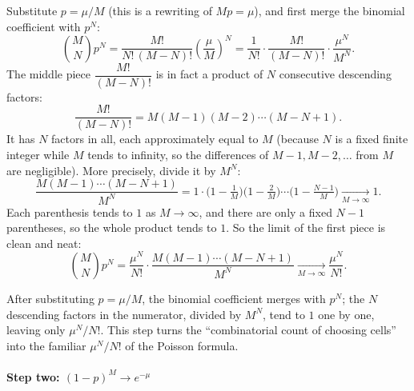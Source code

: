 Substitute $p=\mu/M$ (this is a rewriting of $Mp=\mu$), and first merge the binomial coefficient with $p^N$:
\[
  \binom{M}{N}p^{N}
  =\frac{M!}{N!\,(M-N)!}\left(\frac{\mu}{M}\right)^{N}
  =\frac{1}{N!}\cdot\frac{M!}{(M-N)!}\cdot\frac{\mu^{N}}{M^{N}} .
\]
The middle piece $\dfrac{M!}{(M-N)!}$ is in fact a product of $N$ consecutive descending factors:
\[
  \frac{M!}{(M-N)!}=M(M-1)(M-2)\cdots(M-N+1) .
\]
It has $N$ factors in all, each approximately equal to $M$ (because $N$ is a fixed finite integer while $M$ tends to infinity, so the differences of $M-1,M-2,\dots$ from $M$ are negligible). More precisely, divide it by $M^{N}$:
\[
  \frac{M(M-1)\cdots(M-N+1)}{M^{N}}
  =1\cdot\Big(1-\tfrac{1}{M}\Big)\Big(1-\tfrac{2}{M}\Big)\cdots\Big(1-\tfrac{N-1}{M}\Big)
  \xrightarrow[M\to\infty]{}1 .
\]
Each parenthesis tends to $1$ as $M\to\infty$, and there are only a fixed $N-1$ parentheses, so the whole product tends to $1$. So the limit of the first piece is clean and neat:
\begin{equation}
  \binom{M}{N}p^{N}
  =\frac{\mu^{N}}{N!}\cdot\frac{M(M-1)\cdots(M-N+1)}{M^{N}}
  \xrightarrow[M\to\infty]{}\frac{\mu^{N}}{N!}.
  \label{eq:e03-limit-first}
\end{equation}
\begin{formulaexplain}
After substituting $p=\mu/M$, the binomial coefficient merges with $p^N$; the $N$ descending factors in the numerator, divided by $M^N$, tend to $1$ one by one, leaving only $\mu^N/N!$. This step turns the ``combinatorial count of choosing cells'' into the familiar $\mu^N/N!$ of the Poisson formula.
\end{formulaexplain}

\paragraph{\texorpdfstring{Step two: $(1-p)^{M}\to e^{-\mu}$}{Step two: the limit of the no-click probability}}

